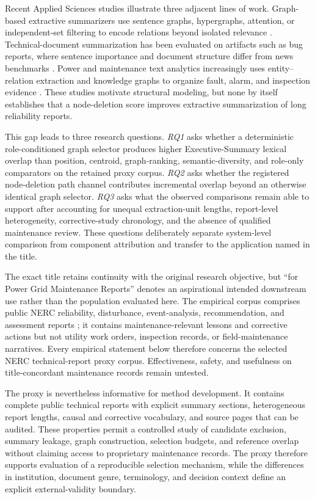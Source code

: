 \documentclass[applsci,article,submit,moreauthors]{Definitions/mdpi}
\begin{document}
Recent Applied Sciences studies illustrate three adjacent lines of work. Graph-based extractive summarizers use sentence graphs, hypergraphs, attention, or independent-set filtering to encode relations beyond isolated relevance \cite{siragusa2022sentencegraph,onan2024mches,hark2025mis}. Technical-document summarization has been evaluated on artifacts such as bug reports, where sentence importance and document structure differ from news benchmarks \cite{koh2022bugreport}. Power and maintenance text analytics increasingly uses entity--relation extraction and knowledge graphs to organize fault, alarm, and inspection evidence \cite{liu2022powerfault,ma2025alarm,zgg2026bridge}. These studies motivate structural modeling, but none by itself establishes that a node-deletion score improves extractive summarization of long reliability reports.

This gap leads to three research questions. \textit{RQ1} asks whether a deterministic role-conditioned graph selector produces higher Executive-Summary lexical overlap than position, centroid, graph-ranking, semantic-diversity, and role-only comparators on the retained proxy corpus. \textit{RQ2} asks whether the registered node-deletion path channel contributes incremental overlap beyond an otherwise identical graph selector. \textit{RQ3} asks what the observed comparisons remain able to support after accounting for unequal extraction-unit lengths, report-level heterogeneity, corrective-study chronology, and the absence of qualified maintenance review. These questions deliberately separate system-level comparison from component attribution and transfer to the application named in the title.

The exact title retains continuity with the original research objective, but ``for Power Grid Maintenance Reports'' denotes an aspirational intended downstream use rather than the population evaluated here. The empirical corpus comprises public NERC reliability, disturbance, event-analysis, recommendation, and assessment reports \cite{nercEventAnalysis,nerc2015qualityreport}; it contains maintenance-relevant lessons and corrective actions but not utility work orders, inspection records, or field-maintenance narratives. Every empirical statement below therefore concerns the selected NERC technical-report proxy corpus. Effectiveness, safety, and usefulness on title-concordant maintenance records remain untested.

The proxy is nevertheless informative for method development. It contains complete public technical reports with explicit summary sections, heterogeneous report lengths, causal and corrective vocabulary, and source pages that can be audited. These properties permit a controlled study of candidate exclusion, summary leakage, graph construction, selection budgets, and reference overlap without claiming access to proprietary maintenance records. The proxy therefore supports evaluation of a reproducible selection mechanism, while the differences in institution, document genre, terminology, and decision context define an explicit external-validity boundary.
\end{document}

